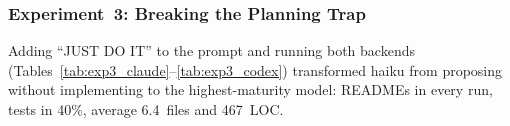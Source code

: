 \documentclass{article}
\begin{document}
\subsubsection{Experiment~3: Breaking the Planning Trap}

Adding ``JUST DO IT'' to the prompt and running both backends
(Tables~\ref{tab:exp3_claude}--\ref{tab:exp3_codex}) transformed
haiku from proposing without implementing to the
highest-maturity model: READMEs in every run, tests in 40\%,
average 6.4~files and 467~LOC.

\begin{table}[t]
\caption{Experiment~3: Claude backend, Anthropic models.}
\label{tab:exp3_claude}
\small{}
\end{table}

\begin{table}[t]
\caption{Experiment~3: Claude backend, GPT models via litellm.}
\label{tab:exp3_gpt_claude}
\small{}
\end{table}
\end{document}
